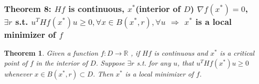 \documentclass[11pt,a4paper]{article}
\newtheorem{theorem}{Theorem}
\begin{document}
\subsubsection{Theorem 8: $Hf$ is continuous, $x^*$(interior of $D$) $\nabla f(x^*)=0$, $\exists r$ s.t. $u^T Hf(x^*) u\geq 0, \forall x\in B(x^*,r),\forall u$ $\Rightarrow$ $x^*$ is a local minimizer of $f$}
\begin{theorem}
    Given a function $f: D \rightarrow\mathbb{R}$ , if $Hf$ is continuous and $x^*$ is a critical point of
    $f$ in the interior of $D$. Suppose $\exists r$ s.t. for any $u$, that $u^T Hf(x^*) u\geq 0$ whenever $x\in B(x^*,r)\subset D$. Then $x^*$ is a local minimizer of $f$.
\end{theorem}
\end{document}
